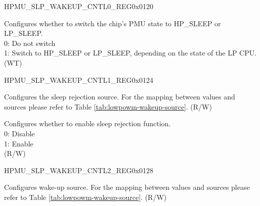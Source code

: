     \begin{register}{H}{PMU\_SLP\_WAKEUP\_CNTL0\_REG}{0x0120}\label{regdesc:PMUSLPWAKEUPCNTL0REG}
    \regnewline%
    \begin{regdesc}\begin{reglist}
    \label{fielddesc:PMUSLEEPREQ}\item [PMU\_SLEEP\_REQ] Configures whether to switch the chip's PMU state to HP\_SLEEP or LP\_SLEEP. \\
0: Do not switch\\
1: Switch to HP\_SLEEP or LP\_SLEEP, depending on the state of the LP CPU.\\
(WT)
    \end{reglist}\end{regdesc}
    \end{register}


    \begin{register}{H}{PMU\_SLP\_WAKEUP\_CNTL1\_REG}{0x0124}\label{regdesc:PMUSLPWAKEUPCNTL1REG}
    \regnewline%
    \begin{regdesc}\begin{reglist}
    \label{fielddesc:PMUSLEEPREJECTENA}\item [PMU\_SLEEP\_REJECT\_ENA] Configures the sleep rejection source. For the mapping between values and sources please refer to Table \ref{tab:lowpowm-wakeup-source}. (R/W)
    \label{fielddesc:PMUSLPREJECTEN}\item [PMU\_SLP\_REJECT\_EN] Configures whether to enable sleep rejection function.\\
0: Disable\\
1: Enable\\
(R/W)
    \end{reglist}\end{regdesc}
    \end{register}


    \begin{register}{H}{PMU\_SLP\_WAKEUP\_CNTL2\_REG}{0x0128}\label{regdesc:PMUSLPWAKEUPCNTL2REG}
    \regnewline%
    \begin{regdesc}\begin{reglist}
    \label{fielddesc:PMUWAKEUPENA}\item [PMU\_WAKEUP\_ENA] Configures wake-up source. For the mapping between values and sources please refer to Table \ref{tab:lowpowm-wakeup-source}. (R/W)
    \end{reglist}\end{regdesc}
    \end{register}


